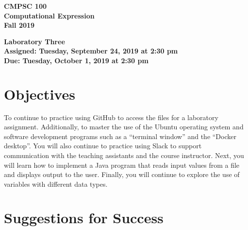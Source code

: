 \documentclass[11pt]{article}
\newcommand{\assignmentduedate}{October 1}
\newcommand{\assignmentassignedate}{September 24}
\newcommand{\assignmentnumber}{Three}
\newcommand{\labyear}{2019}
\newcommand{\labday}{Tuesday}
\newcommand{\labtime}{2:30 pm}
\newcommand{\assigneddate}{Assigned: \labday, \assignmentassignedate, \labyear{} at \labtime{}}
\newcommand{\duedate}{Due: \labday, \assignmentduedate, \labyear{} at \labtime{}}
\newcommand{\labtitle}[1]
{
  \begin{center}
    \begin{center}
      \bf
      CMPSC 100\\Computational Expression\\
      Fall 2019\\
      \medskip
    \end{center}
    \bf
    #1
  \end{center}
}
\begin{document}
\thispagestyle{empty}

\labtitle{Laboratory \assignmentnumber{} \\ \assigneddate{} \\ \duedate{}}

\section*{Objectives}

To continue to practice using GitHub to access the files for a laboratory
assignment. Additionally, to master the use of the Ubuntu operating system and
software development programs such as a ``terminal window'' and the ``Docker
desktop''. You will also continue to practice using Slack to support
communication with the teaching assistants and the course instructor. Next, you
will learn how to implement a Java program that reads input values from a file
and displays output to the user. Finally, you will continue to explore the use
of variables with different data types.

\section*{Suggestions for Success}
\end{document}
